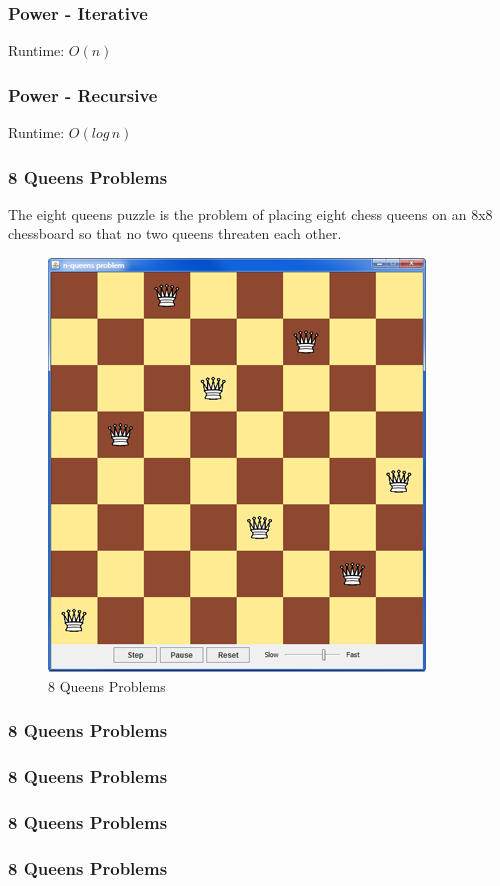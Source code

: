 \begin{frame}[fragile]
\frametitle{Power - Iterative}
{\tiny

}
Runtime: $O(n)$
\end{frame}

\begin{frame}[fragile]
\frametitle{Power - Recursive}
{\tiny

}
Runtime: $O(log \, n)$
\end{frame}

\begin{frame}[fragile]
\frametitle{8 Queens Problems}
The eight queens puzzle is the problem of placing eight chess queens
on an 8x8 chessboard so that no two queens threaten each other.
\begin{figure}[h]
\centering\includegraphics[scale=0.3]{img/8queens.png}
\caption{8 Queens Problems}
\end{figure}
\end{frame}

\begin{frame}[fragile]
\frametitle{8 Queens Problems}
{\tiny

}
\end{frame}

\begin{frame}[fragile]
\frametitle{8 Queens Problems}
{\tiny

}
\end{frame}

\begin{frame}[fragile]
\frametitle{8 Queens Problems}
{\tiny

}
\end{frame}

\begin{frame}[fragile]
\frametitle{8 Queens Problems}
{\tiny

}
\end{frame}


